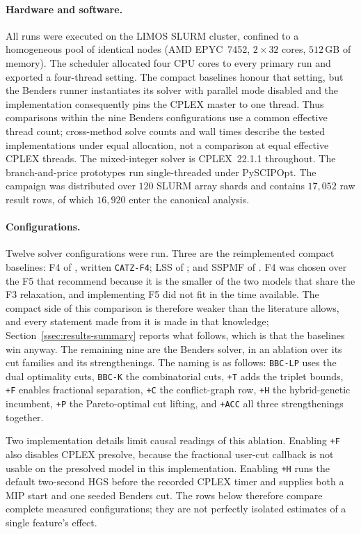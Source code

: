 \paragraph{Hardware and software.}
All runs were executed on the LIMOS SLURM cluster, confined to a homogeneous pool of
identical nodes (AMD EPYC~7452, $2\times32$ cores, $512$\,GB of memory). The scheduler
allocated four CPU cores to every primary run and exported a four-thread setting.
The compact baselines honour that setting, but the Benders runner instantiates its
solver with parallel mode disabled and the implementation consequently pins the CPLEX
master to one thread. Thus comparisons within the nine Benders configurations use a
common effective thread count; cross-method solve counts and wall times describe the
tested implementations under equal allocation, not a comparison at equal effective
CPLEX threads. The mixed-integer solver is CPLEX~22.1.1 throughout. The branch-and-price
prototypes run single-threaded under PySCIPOpt. The campaign was distributed over $120$ SLURM
array shards and contains $17{,}052$ raw result rows, of which $16{,}920$ enter the
canonical analysis.

\paragraph{Configurations.}
Twelve solver configurations were run. Three are the reimplemented compact baselines:
F4 of \citet{Catanzaro2015}, written \texttt{CATZ-F4}; LSS of \citet{Laporte2004}; and
SSPMF of \citet{daSilva2024}. F4 was chosen over the F5 that \citet{Catanzaro2015}
recommend because it is the smaller of the two models that share the F3 relaxation, and
implementing F5 did not fit in the time available. The compact side of this comparison
is therefore weaker than the literature allows, and every statement made from it is
made in that knowledge; Section~\ref{ssec:results-summary} reports what follows, which
is that the baselines win anyway. The remaining nine are the Benders solver, in an ablation
over its cut families and its strengthenings. The naming is as follows:
\texttt{BBC-LP} uses the dual optimality cuts, \texttt{BBC-K} the combinatorial cuts,
\texttt{+T} adds the triplet bounds, \texttt{+F} enables fractional separation,
\texttt{+C} the conflict-graph row, \texttt{+H} the hybrid-genetic incumbent,
\texttt{+P} the Pareto-optimal cut lifting, and \texttt{+ACC} all three strengthenings
together.

Two implementation details limit causal readings of this ablation. Enabling
\texttt{+F} also disables CPLEX presolve, because the fractional user-cut callback is
not usable on the presolved model in this implementation. Enabling \texttt{+H} runs
the default two-second HGS before the recorded CPLEX timer and supplies both a MIP
start and one seeded Benders cut. The rows below therefore compare complete measured
configurations; they are not perfectly isolated estimates of a single feature's
effect.


